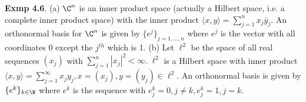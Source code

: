 {\bf Exmp 4.6}. (a) $\C^n$ is an inner product space (actually a Hilbert space, i.e. a complete inner product space) with the inner product $\langle x,y \rangle = \sum_{j=1}^nx_j\bar{y}_j$.  An orthonormal basis for $\C^n$ is given by $\{e^j\}_{j=1,\dots,n}$ where $e^j$ is the vector with all coordinates 0 except the $j^{th}$ which is 1. (b) Let $\ell^2$ be the space of all real sequences $(x_j)$ with $\sum_{j=1}^n|x_j|^2 < \infty. \; \ell^2$ is a Hilbert space with inner product $\langle x,y \rangle = \sum_{j=1}^{\infty} x_j y_j, x=(x_j), y=(y_j)\in \ell^2$. An orthonormal basis is given by $\{e^k\}_{k\in \N}$ where $e^k$ is the sequence with $e_j^k=0, j \neq k, e_j^k=1, j=k$.